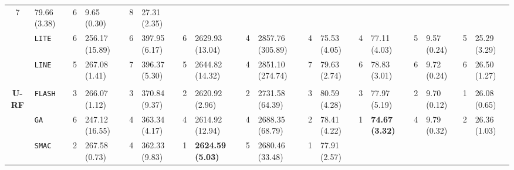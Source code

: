 \begin{tabular}{clllllllllllllllll}
  7 &
  \multicolumn{1}{l|}{79.66 (3.38)} &
  6 &
  \multicolumn{1}{l|}{9.65 (0.30)} &
  8 &
  27.31 (2.35) \\
\multicolumn{1}{c|}{} &
  \multicolumn{1}{l|}{\texttt{LITE}} &
  6 &
  \multicolumn{1}{l|}{256.17 (15.89)} &
  6 &
  \multicolumn{1}{l|}{397.95 (6.17)} &
  6 &
  \multicolumn{1}{l|}{2629.93 (13.04)} &
  4 &
  \multicolumn{1}{l|}{2857.76 (305.89)} &
  4 &
  \multicolumn{1}{l|}{75.53 (4.05)} &
  4 &
  \multicolumn{1}{l|}{77.11 (4.03)} &
  5 &
  \multicolumn{1}{l|}{9.57 (0.24)} &
  5 &
  25.29 (3.29) \\
\multicolumn{1}{c|}{} &
  \multicolumn{1}{l|}{\texttt{LINE}} &
  5 &
  \multicolumn{1}{l|}{267.08 (1.41)} &
  7 &
  \multicolumn{1}{l|}{396.37 (5.30)} &
  5 &
  \multicolumn{1}{l|}{2644.82 (14.32)} &
  4 &
  \multicolumn{1}{l|}{2851.10 (274.74)} &
  7 &
  \multicolumn{1}{l|}{79.63 (2.74)} &
  6 &
  \multicolumn{1}{l|}{78.83 (3.01)} &
  6 &
  \multicolumn{1}{l|}{9.72 (0.24)} &
  6 &
  26.50 (1.27) \\
\hline
\multicolumn{1}{l}{\textbf{}} &
    &
    &
    &
    &
    &
    &
    &
    &
    &
    &
    &
    &
    &
    &
    &
    &
    \\ \hline
\multicolumn{1}{c|}{\multirow{9}{*}{\textbf{U-RF}}} &
  \multicolumn{1}{l|}{\texttt{FLASH}} &
  3 &
  \multicolumn{1}{l|}{266.07 (1.12)} &
  3 &
  \multicolumn{1}{l|}{370.84 (9.37)} &
  2 &
  \multicolumn{1}{l|}{2620.92 (2.96)} &
  2 &
  \multicolumn{1}{l|}{2731.58 (64.39)} &
  3 &
  \multicolumn{1}{l|}{80.59 (4.28)} &
  3 &
  \multicolumn{1}{l|}{77.97 (5.19)} &
  2 &
  \multicolumn{1}{l|}{9.70 (0.12)} &
  \cellcolor{blue!15}1 &
  \cellcolor{blue!15}26.08 (0.65) \\
\multicolumn{1}{c|}{} &
  \multicolumn{1}{l|}{\texttt{GA}} &
  6 &
  \multicolumn{1}{l|}{247.12 (16.55)} &
  4 &
  \multicolumn{1}{l|}{363.34 (4.17)} &
  4 &
  \multicolumn{1}{l|}{2614.92 (12.94)} &
  4 &
  \multicolumn{1}{l|}{2688.35 (68.79)} &
  2 &
  \multicolumn{1}{l|}{78.41 (4.22)} &
  \cellcolor{blue!15}1 &
  \multicolumn{1}{l|}{\cellcolor{blue!15}\textbf{74.67 (3.32)}} &
  4 &
  \multicolumn{1}{l|}{9.79 (0.32)} &
  2 &
  26.36 (1.03) \\
\multicolumn{1}{c|}{} &
  \multicolumn{1}{l|}{\texttt{SMAC}} &
  2 &
  \multicolumn{1}{l|}{267.58 (0.73)} &
  4 &
  \multicolumn{1}{l|}{362.33 (9.83)} &
  \cellcolor{blue!15}1 &
  \multicolumn{1}{l|}{\cellcolor{blue!15}\textbf{2624.59 (5.03)}} &
  5 &
  \multicolumn{1}{l|}{2680.46 (33.48)} &
  \cellcolor{blue!15}1 &
  \multicolumn{1}{l|}{\cellcolor{blue!15}77.91 (2.57)} &

\end{tabular}
